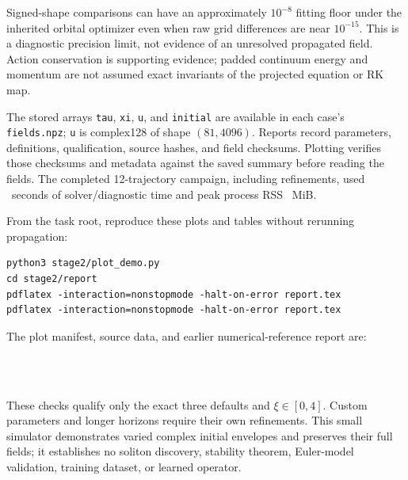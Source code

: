 \documentclass[11pt]{article}
\begin{document}
Signed-shape comparisons can have an approximately $10^{-8}$ fitting floor
under the inherited orbital optimizer even when raw grid differences are
near $10^{-15}$. This is a diagnostic precision limit, not evidence of an
unresolved propagated field. Action conservation is supporting evidence;
padded continuum energy and momentum are not assumed exact invariants of
the projected equation or RK map.

The stored arrays \texttt{tau}, \texttt{xi}, \texttt{u}, and \texttt{initial}
are available in each case's \texttt{fields.npz}; \texttt{u} is complex128 of
shape $(81,4096)$. Reports record parameters, definitions, qualification,
source hashes, and field checksums. Plotting verifies those checksums and
metadata against the saved summary before reading the fields. The completed
12-trajectory campaign, including refinements, used \DemoTotalSeconds\ seconds
of solver/diagnostic time and peak process RSS \DemoPeakRSS\ MiB.

From the task root, reproduce these plots and tables without rerunning propagation:
\begin{verbatim}
python3 stage2/plot_demo.py
cd stage2/report
pdflatex -interaction=nonstopmode -halt-on-error report.tex
pdflatex -interaction=nonstopmode -halt-on-error report.tex
\end{verbatim}
The plot manifest, source data, and earlier numerical-reference report are:
\begin{flushleft}
\small
{}\\
\\
\end{flushleft}

These checks qualify only the exact three defaults and $\xi\in[0,4]$.
Custom parameters and longer horizons require their own refinements. This
small simulator demonstrates varied complex initial envelopes and preserves
their full fields; it establishes no soliton discovery, stability theorem,
Euler-model validation, training dataset, or learned operator.
\end{document}
